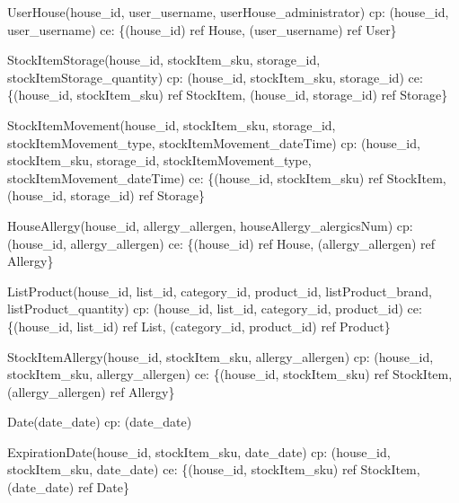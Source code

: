 {\begin{description}
		\item UserHouse(house\_id, user\_username, userHouse\_administrator) \newline
		\acrshort{cp}: (house\_id, user\_username) \newline
		\acrshort{ce}: \{(house\_id) ref House, (user\_username) ref User\}
		
		\item StockItemStorage(house\_id, stockItem\_sku, storage\_id, stockItemStorage\_quantity) \newline
		\acrshort{cp}: (house\_id, stockItem\_sku, storage\_id) \newline
		\acrshort{ce}: \{(house\_id, stockItem\_sku) ref StockItem, (house\_id, storage\_id) ref Storage\}
		
		\item StockItemMovement(house\_id, stockItem\_sku, storage\_id, stockItemMovement\_type, \newline stockItemMovement\_dateTime) \newline
		\acrshort{cp}: (house\_id, stockItem\_sku, storage\_id, stockItemMovement\_type, \newline stockItemMovement\_dateTime) \newline
		\acrshort{ce}: \{(house\_id, stockItem\_sku) ref StockItem, (house\_id, storage\_id) ref Storage\}
		
		\item HouseAllergy(house\_id, allergy\_allergen, houseAllergy\_alergicsNum) \newline
		\acrshort{cp}: (house\_id, allergy\_allergen) \newline
		\acrshort{ce}: \{(house\_id) ref House, (allergy\_allergen) ref Allergy\}
		
		\item ListProduct(house\_id, list\_id, category\_id, product\_id, listProduct\_brand, listProduct\_quantity) \newline
		\acrshort{cp}: (house\_id, list\_id, category\_id, product\_id) \newline
		\acrshort{ce}: \{(house\_id, list\_id) ref List, (category\_id, product\_id) ref Product\}
		
		\item StockItemAllergy(house\_id, stockItem\_sku, allergy\_allergen) \newline
		\acrshort{cp}: (house\_id, stockItem\_sku, allergy\_allergen) \newline
		\acrshort{ce}: \{(house\_id, stockItem\_sku) ref StockItem, (allergy\_allergen) ref Allergy\}
		
		\item Date(date\_date) \newline
		\acrshort{cp}: (date\_date)
		
		\item ExpirationDate(house\_id, stockItem\_sku, date\_date) \newline
		\acrshort{cp}: (house\_id, stockItem\_sku, date\_date) \newline
		\acrshort{ce}: \{(house\_id, stockItem\_sku) ref StockItem, (date\_date) ref Date\}
	\end{description}	
}


